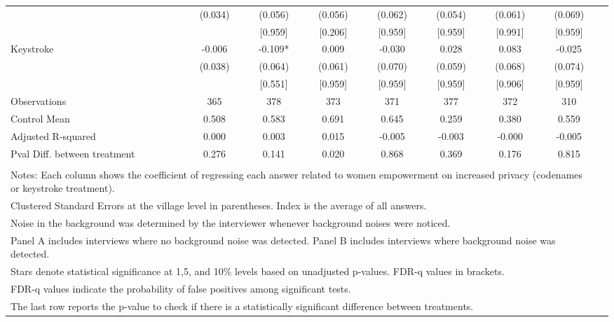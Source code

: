 \begin{tabular}{l*{8}{c}}
                    &     (0.034)   &     (0.056)   &     (0.056)   &     (0.062)   &     (0.054)   &     (0.061)   &     (0.069)   \\
                    &               &     [0.959]   &     [0.206]   &     [0.959]   &     [0.959]   &     [0.991]   &     [0.959]   \\
Keystroke           &      -0.006   &      -0.109*  &       0.009   &      -0.030   &       0.028   &       0.083   &      -0.025   \\
                    &     (0.038)   &     (0.064)   &     (0.061)   &     (0.070)   &     (0.059)   &     (0.068)   &     (0.074)   \\
                    &               &     [0.551]   &     [0.959]   &     [0.959]   &     [0.959]   &     [0.906]   &     [0.959]   \\
\hline
Observations        &         365   &         378   &         373   &         371   &         377   &         372   &         310   \\
Control Mean        &       0.508   &       0.583   &       0.691   &       0.645   &       0.259   &       0.380   &       0.559   \\
Adjusted R-squared  &       0.000   &       0.003   &       0.015   &      -0.005   &      -0.003   &      -0.000   &      -0.005   \\
Pval Diff. between treatment&       0.276   &       0.141   &       0.020   &       0.868   &       0.369   &       0.176   &       0.815   \\
\hline \\ \multicolumn{8}{l}{\tiny Notes: Each column shows the coefficient of regressing each answer related to women empowerment
on increased privacy (codenames or keystroke treatment).} \\ \multicolumn{8}{l}{\tiny Clustered Standard Errors at the village level in parentheses. Index is the average of all answers.} \\ \multicolumn{8}{l}{\tiny Noise in the background was determined by the interviewer whenever background noises were noticed.} \\ \multicolumn{8}{l}{\tiny Panel A includes interviews where no background noise was detected. Panel B includes interviews where background noise was detected. } \\  \multicolumn{8}{l}{\tiny Stars denote statistical significance at 1,5, and 10\% levels based on unadjusted p-values. FDR-q values in brackets.} \\ \multicolumn{8}{l}{\tiny FDR-q values indicate the probability of false positives among significant tests.} \\ \multicolumn{8}{l}{\tiny The last row reports the p-value to check if there is a statistically significant difference between treatments. } \\  \hline\hline \end{tabular}
